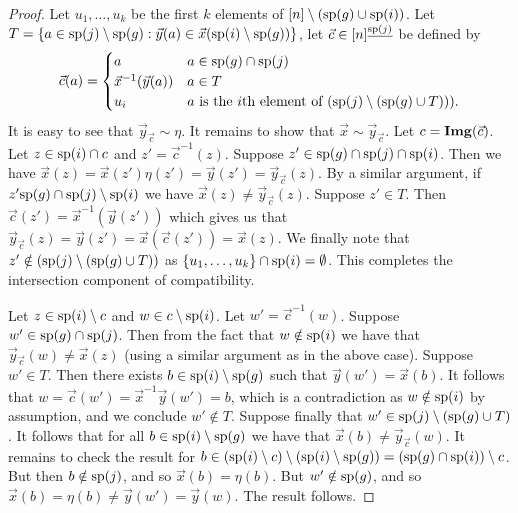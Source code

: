 \documentclass[../paper.tex]{subfiles}
\begin{document}
\begin{proof}
	Let $u_1, \ldots , u_k$ be the first $k$ elements of $[n] \setminus (\text{sp}(g)
  \cup \text{sp}(i))$. Let $T = \{a \in \text{sp}(j) \setminus \text{sp}(g) : \vec{y}(a)
  \in \vec{x}(\text{sp}(i) \setminus \text{sp}(g))\}$, let $\vec{c} \in
  [n]^{\underline{\text{sp}(j)}}$ be defined by
	\[
		\vec{c} (a) =
		\begin{cases}
			a                        & a \in \text{sp}(g) \cap \text{sp}(j)                                     \\
			\vec{x}^{-1}(\vec{y}(a)) & a \in T                                                            \\
			u_{i} & \text{$a$ is the $i$th element of $(\text{sp}(j) \setminus (\text{sp}(g)
        \cup T)))$}.
		\end{cases}
	\]
	It is easy to see that $\vec{y}_{\vec{c}} \sim \eta$. It remains to show that
  $\vec{x} \sim \vec{y}_{\vec{c}}$. Let $c = \text{\textbf{Img}}(\vec{c})$. Let $z \in
  \text{sp}(i) \cap c$ and $z' = \vec{c}^{-1}(z)$. Suppose $z' \in \text{sp}(g)\cap
  \text{sp}(j) \cap \text{sp}(i)$. Then we have $\vec{x}(z) = \vec{x}(z') \eta (z') =
  \vec{y}(z') = \vec{y}_{\vec{c}}(z)$. By a similar argument, if $z' \text{sp}(g)
  \cap \text{sp}(j) \setminus \text{sp}(i)$ we have $\vec{x}(z) \neq
  \vec{y}_{\vec{c}}(z)$. Suppose $z' \in T$. Then $\vec{c}(z') =
  \vec{x}^{-1}(\vec{y}(z'))$ which gives us that $\vec{y}_{\vec{c}}(z) =
  \vec{y}(z') = \vec{x}(\vec{c}(z')) = \vec{x}(z)$. We finally note that $z'
  \notin (\text{sp}(j) \setminus (\text{sp}(g) \cup T))$ as $\{u_1 , \ldots , u_k\}
  \cap \text{sp}(i) = \emptyset$. This completes the intersection component of
  compatibility.
		
	Let $z \in \text{sp}(i) \setminus c$ and $w \in c \setminus \text{sp}(i)$. Let $w' =
  \vec{c}^{-1}(w)$. Suppose $w' \in \text{sp}(g) \cap \text{sp}(j)$. Then from the
  fact that $w \notin \text{sp}(i)$ we have that $\vec{y}_{\vec{c}}(w) \neq
  \vec{x}(z)$ (using a similar argument as in the above case). Suppose $w' \in
  T$. Then there exists $b \in \text{sp}(i) \setminus \text{sp}(g)$ such that
  $\vec{y}(w') = \vec{x}(b)$. It follows that $w = \vec{c}(w') =
  \vec{x}^{-1}\vec{y} (w') = b$, which is a contradiction as $w \notin
  \text{sp}(i)$ by assumption, and we conclude $w' \notin T$. Suppose finally that
  $w' \in \text{sp}(j) \setminus (\text{sp}(g) \cup T)$. It follows that for all $b
  \in \text{sp}(i) \setminus \text{sp}(g)$ we have that $\vec{x}(b) \neq
  \vec{y}_{\vec{c}}(w)$. It remains to check the result for $b \in (\text{sp}(i)
  \setminus c) \setminus (\text{sp}(i) \setminus \text{sp}(g)) = (\text{sp}(g) \cap
  \text{sp}(i)) \setminus c$. But then $b \notin \text{sp}(j)$, and so $\vec{x}(b) =
  \eta (b)$. But $w' \notin \text{sp}(g)$, and so $\vec{x}(b) = \eta(b) \neq
  \vec{y}(w') = \vec{y}(w)$. The result follows.
\end{proof}
\end{document}
